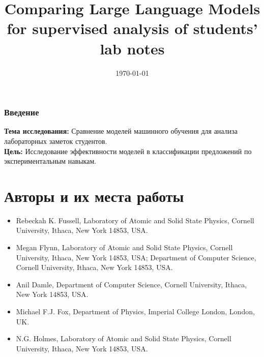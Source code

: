 \documentclass[aspectratio=169]{beamer}
\title[Analysis of Student's Lab Notes]{Comparing Large Language Models for supervised analysis of students’ lab notes}
\date{\today}
\begin{document}
\frame[plain]{\titlepage}

\begin{frame}
    \frametitle{Введение}
    \textbf{Тема исследования:} Сравнение моделей машинного обучения для анализа лабораторных заметок студентов. \\
    \textbf{Цель:} Исследование эффективности моделей в классификации предложений по экспериментальным навыкам. \\
\end{frame}

\section*{Авторы и их места работы}

\begin{itemize}
    \item Rebeckah K. Fussell, Laboratory of Atomic and Solid State Physics, Cornell University, Ithaca, New York 14853, USA.
    \item Megan Flynn, Laboratory of Atomic and Solid State Physics, Cornell University, Ithaca, New York 14853, USA; Department of Computer Science, Cornell University, Ithaca, New York 14853, USA.
    \item Anil Damle, Department of Computer Science, Cornell University, Ithaca, New York 14853, USA.
    \item Michael F.J. Fox, Department of Physics, Imperial College London, London, UK.
    \item N.G. Holmes, Laboratory of Atomic and Solid State Physics, Cornell University, Ithaca, New York 14853, USA.
\end{itemize}
\end{document}
